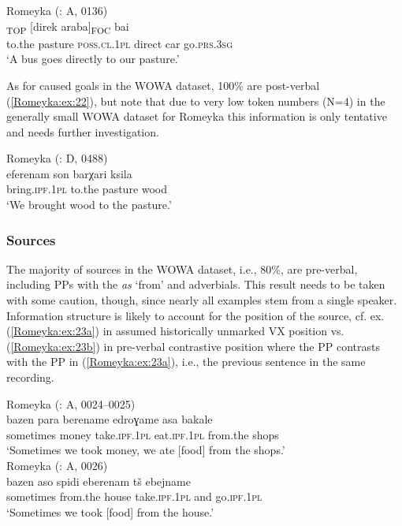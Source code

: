 \documentclass[output=paper,colorlinks,citecolor=brown]{langscibook}
\begin{document}
\ea\label{Romeyka:ex:21}
Romeyka (\citealt{schreiber2021pontic}: A, 0136) \\
\textsubscript{TOP} [direk araba]\textsubscript{FOC} bai \\
to.the pasture \textsc{poss.cl.1pl} direct car go\textsc{.prs.3sg} \\
\glt 	`A bus goes directly to our pasture.'  \\
\z

As for caused goals in the WOWA dataset, 100\% are post-verbal (\ref{Romeyka:ex:22}), but note that due to very low token numbers (N=4) in the generally small WOWA dataset for Romeyka this information is only tentative and needs further investigation. 

\ea\label{Romeyka:ex:22}
Romeyka (\citealt{schreiber2021pontic}: D, 0488) \\
\gll eferenam son barχari ksila \\
bring\textsc{.ipf.1pl} to.the pasture wood \\
\glt `We brought wood to the pasture.'  \\
\z

\subsubsection{Sources}\label{Romeyka:ss:4.3.3}

The majority of sources in the WOWA dataset, i.e., 80\%, are pre-verbal, including PPs with the  \textit{as} `from' and adverbials. This result needs to be taken with some caution, though, since nearly all examples stem from a single speaker. Information structure is likely to account for the position of the source, cf. ex. (\ref{Romeyka:ex:23a}) in assumed historically unmarked VX position vs. (\ref{Romeyka:ex:23b}) in pre-verbal contrastive  position where the PP contrasts with the PP in (\ref{Romeyka:ex:23a}), i.e., the previous sentence in the same recording.

\ea\label{Romeyka:ex:23}
\ea\label{Romeyka:ex:23a}
Romeyka (\citealt{schreiber2021pontic}: A, 0024--0025) \\
\gll bazen para berename edroɣame asa bakale \\
sometimes money take\textsc{.ipf.1pl} eat\textsc{.ipf.1pl} from.the shops \\
\glt `Sometimes we took money, we ate [food] from the shops.'  \\
\ex\label{Romeyka:ex:23b}
Romeyka (\citealt{schreiber2021pontic}: A, 0026) \\
\gll bazen aso spidi eberenam tš ebejname \\
sometimes from.the house take\textsc{.ipf.1pl} and go\textsc{.ipf.1pl} \\
\glt `Sometimes we took [food] from the house.' 
\z
\z
\end{document}
